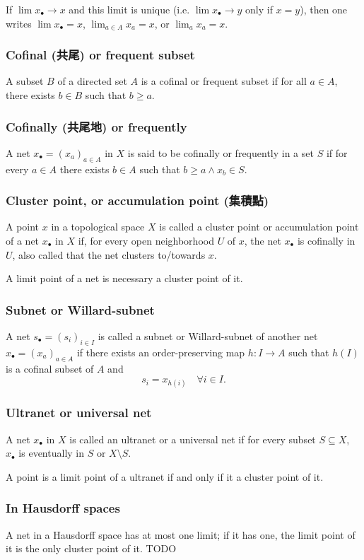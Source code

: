 \documentclass[a4paper,12pt]{article}
\begin{document}
If $\lim x_{\bullet}\to x$ and this limit is unique (i.e. $\lim x_{\bullet}\to y$ only if $x=y$), then one writes $\lim x_{\bullet}=x$, $\lim_{a\in A}x_a=x$, or $\lim_ax_a=x$.
\subsubsection{Cofinal (共尾) or frequent subset}
A subset $B$ of a directed set $A$ is a cofinal or frequent subset if for all $a\in A$, there exists $b\in B$ such that $b\geq a$.
\subsubsection{Cofinally (共尾地) or frequently}
A net $x_{\bullet }=\left(x_{a}\right)_{a\in A}$ in $X$ is said to be cofinally or frequently in a set $S$ if for every $a\in A$ there exists $b\in A$ such that $b\geq a\land x_b\in S$.
\subsubsection{Cluster point, or accumulation point (集積點)}
A point $x$ in a topological space $X$ is called a cluster point or accumulation point of a net $x_{\bullet }$ in $X$ if, for every open neighborhood $U$ of $x$, the net $x_{\bullet }$ is cofinally in $U$, also called that the net clusters to/towards $x$.

A limit point of a net is necessary a cluster point of it.
\subsubsection{Subnet or Willard-subnet}
A net $s_{\bullet }=\left(s_{i}\right)_{i\in I}$ is called a subnet or Willard-subnet of another net $x_{\bullet }=\left(x_{a}\right)_{a\in A}$ if there exists an order-preserving map $h\colon I\to A$ such that $h(I)$ is a cofinal subset of $A$ and 
\[s_{i}=x_{h(i)}\quad \forall i\in I.\]
\subsubsection{Ultranet or universal net}
A net $x_{\bullet }$ in $X$ is called an ultranet or a universal net if for every subset $S\subseteq X$, $x_{\bullet }$ is eventually in $S$ or $X\setminus S$.

A point is a limit point of a ultranet if and only if it a cluster point of it.
\subsubsection{In Hausdorff spaces}
A net in a Hausdorff space has at most one limit; if it has one, the limit point of it is the only cluster point of it.
\bpr
TODO
\epr
\end{document}
